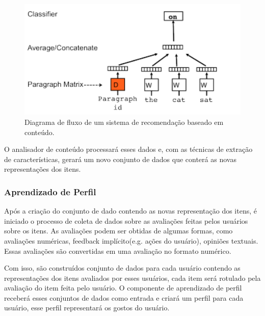 \begin{itemize}
    \begin{figure}[h!]
    \centering
    \includegraphics[width=12cm]{Imagens/framework_doc2vec.png}
    \caption{Diagrama de fluxo de um sistema de recomendação baseado em conteúdo.}
    \label{fig:framework_doc2vec}
    \end{figure}
    
\end{itemize}

O analisador de conteúdo processará esses dados e, com as técnicas de extração de características, gerará um novo conjunto de dados que conterá as novas representações dos itens.


\subsubsection{Aprendizado de Perfil}
Após a criação do conjunto de dado contendo as novas representação dos itens, é iniciado o processo de coleta de dados sobre as avaliações feitas pelos usuários sobre os itens. As avaliações podem ser obtidas de algumas formas, como avaliações numéricas, feedback implícito(e.g. ações do usuário), opiniões textuais. Essas avaliações são convertidas em uma avaliação no formato numérico\cite{aggarwal2016recommender}.

Com isso, são construídos conjunto de dados para cada usuário contendo as representações dos itens avaliados por esses usuários, cada item será rotulado pela avaliação do item feita pelo usuário. O componente de aprendizado de perfil receberá esses conjuntos de dados como entrada e criará um perfil para cada usuário, esse perfil representará os gostos do usuário.

